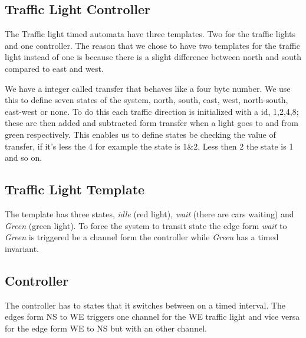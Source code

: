 \subsection{Traffic Light Controller}
\label{sec:org7954bf6}
The Traffic light timed automata have three templates. Two for the traffic lights and one controller. The reason that we chose to have two templates for the traffic light instead of one is because there is a slight difference between north and south compared to east and west. 

We have a integer called transfer that behaves like a four byte number. We use this to define seven states of the system, north, south, east, west, north-south, east-west or none. To do this each traffic direction is initialized with a id, 1,2,4,8; these are then added and subtracted form transfer when a light goes to and from green respectively. This enables us to define states be checking the value of transfer, if it's less the 4 for example the state is 1\&2. Less then 2 the state is 1 and so on.

\subsection{Traffic Light Template}
\label{sec:orgc8497f6}
The template has three states, \emph{idle} (red light), \emph{wait} (there are cars waiting) and \emph{Green} (green light). To force the system to transit state the edge form \emph{wait} to \emph{Green} is triggered be a channel form the controller while \emph{Green} has a timed invariant. 

\subsection{Controller}
\label{sec:org0c24095}
The controller has to states that it switches between on a timed interval. The edges form NS to WE triggers one channel for the WE traffic light and vice versa for the edge form WE to NS but with an other channel.

